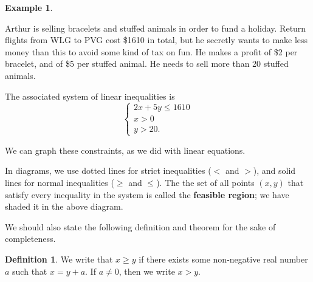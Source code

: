 \documentclass[a4paper,leqno]{article}
\numberwithin{equation}{section}
\theoremstyle{definition}
\newtheorem{defn}[equation]{Definition}
\newtheorem{ex}[equation]{Example}
\theoremstyle{remark}
\newcommand{\df}[1]{\textbf{#1}}
\begin{document}
\begin{ex}\leavevmode
  \begin{center}
    \itshape\parbox{0.8\textwidth}{
      Arthur is selling bracelets and stuffed animals in order to fund a holiday. Return flights from WLG to PVG cost \$1610 in total, but
      he secretly wants to make less money than this to avoid some kind of tax on fun. He makes a profit of \$2 per bracelet, and of \$5 per stuffed
      animal. He needs to sell more than 20 stuffed animals.
    }
  \end{center}

  The associated system of linear inequalities is
  \begin{equation}
    \begin{cases}
      2x + 5y \leq 1610\\
      x > 0\\
      y > 20.
    \end{cases}
  \end{equation}

  We can graph these constraints, as we did with linear equations.
  \begin{center}
  \end{center}

  In diagrams, we use dotted lines for strict inequalities ($ < $ and $ > $), and solid lines for normal inequalities ($ \geq $ and $ \leq $).
  The the set of all points $ (x,y) $ that satisfy every inequality in the system is called the \df{feasible region}; we have shaded it in the
  above diagram.
\end{ex}

We should also state the following definition and theorem for the sake of completeness.
\begin{defn}
  We write that $ x \geq y $ if there exists some non-negative real number $ a $ such that $ x = y + a $. If $ a \neq 0 $,
  then we write $ x > y $.
\end{defn}
\end{document}
